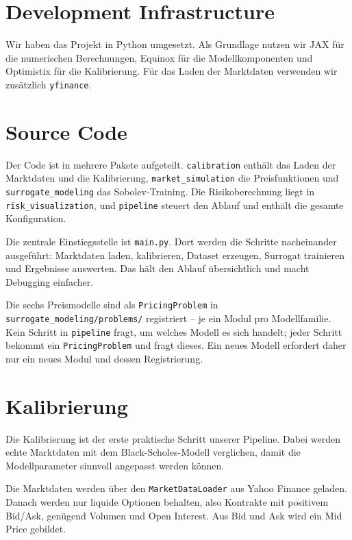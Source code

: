 \documentclass{book}
\begin{document}
\section{Development Infrastructure}

Wir haben das Projekt in Python umgesetzt. Als Grundlage nutzen wir JAX für die numerischen Berechnungen, Equinox für die Modellkomponenten und Optimistix für die Kalibrierung. Für das Laden der Marktdaten verwenden wir zusätzlich \texttt{yfinance}.

\section{Source Code}

Der Code ist in mehrere Pakete aufgeteilt. \texttt{calibration} enthält das Laden der Marktdaten und die Kalibrierung, \texttt{market\_simulation} die Preisfunktionen und \texttt{surrogate\_modeling} das Sobolev-Training. Die Risikoberechnung liegt in \texttt{risk\_visualization}, und \texttt{pipeline} steuert den Ablauf und enthält die gesamte Konfiguration.

Die zentrale Einstiegsstelle ist \texttt{main.py}. Dort werden die Schritte nacheinander ausgeführt: Marktdaten laden, kalibrieren, Dataset erzeugen, Surrogat trainieren und Ergebnisse auswerten. Das hält den Ablauf übersichtlich und macht Debugging einfacher.

Die sechs Preismodelle sind als \texttt{PricingProblem} in \texttt{surrogate\_modeling/problems/} registriert -- je ein Modul pro Modellfamilie. Kein Schritt in \texttt{pipeline} fragt, um welches Modell es sich handelt; jeder Schritt bekommt ein \texttt{PricingProblem} und fragt dieses. Ein neues Modell erfordert daher nur ein neues Modul und dessen Registrierung.

\section{Kalibrierung}

Die Kalibrierung ist der erste praktische Schritt unserer Pipeline. Dabei werden echte Marktdaten mit dem Black-Scholes-Modell verglichen, damit die Modellparameter sinnvoll angepasst werden können.

Die Marktdaten werden über den \texttt{MarketDataLoader} aus Yahoo Finance geladen. Danach werden nur liquide Optionen behalten, also Kontrakte mit positivem Bid/Ask, genügend Volumen und Open Interest. Aus Bid und Ask wird ein Mid Price gebildet.
\end{document}
